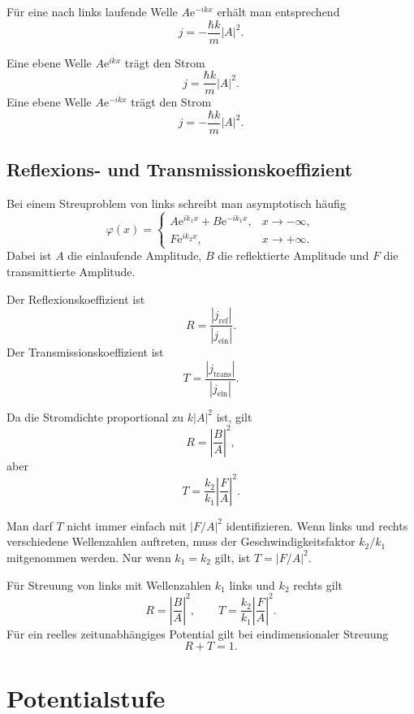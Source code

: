 Für eine nach links laufende Welle $A\mathrm{e}^{-ikx}$ erhält man entsprechend
\[
    j=-\frac{\hbar k}{m}|A|^2.
\]

\begin{formulabox}
Eine ebene Welle $A\mathrm{e}^{ikx}$ trägt den Strom
\[
    j=\frac{\hbar k}{m}|A|^2.
\]
Eine ebene Welle $A\mathrm{e}^{-ikx}$ trägt den Strom
\[
    j=-\frac{\hbar k}{m}|A|^2.
\]
\end{formulabox}

\subsection{Reflexions- und Transmissionskoeffizient}

Bei einem Streuproblem von links schreibt man asymptotisch häufig
\[
    \varphi(x)=
    \begin{cases}
        A\mathrm{e}^{ik_1x}+B\mathrm{e}^{-ik_1x}, & x\to -\infty,\\
        F\mathrm{e}^{ik_2x}, & x\to +\infty.
    \end{cases}
\]
Dabei ist $A$ die einlaufende Amplitude, $B$ die reflektierte Amplitude und $F$ die transmittierte Amplitude.

Der Reflexionskoeffizient ist
\[
    R=\frac{|j_{\mathrm{ref}}|}{|j_{\mathrm{ein}}|}.
\]
Der Transmissionskoeffizient ist
\[
    T=\frac{|j_{\mathrm{trans}}|}{|j_{\mathrm{ein}}|}.
\]

Da die Stromdichte proportional zu $k|A|^2$ ist, gilt
\[
    R=\left|\frac{B}{A}\right|^2,
\]
aber
\[
    T=\frac{k_2}{k_1}\left|\frac{F}{A}\right|^2.
\]

\begin{notebox}
Man darf $T$ nicht immer einfach mit $|F/A|^2$ identifizieren. Wenn links und rechts verschiedene Wellenzahlen auftreten, muss der Geschwindigkeitsfaktor $k_2/k_1$ mitgenommen werden. Nur wenn $k_1=k_2$ gilt, ist $T=|F/A|^2$.
\end{notebox}

\begin{formulabox}
Für Streuung von links mit Wellenzahlen $k_1$ links und $k_2$ rechts gilt
\[
    R=\left|\frac{B}{A}\right|^2,
    \qquad
    T=\frac{k_2}{k_1}\left|\frac{F}{A}\right|^2.
\]
Für ein reelles zeitunabhängiges Potential gilt bei eindimensionaler Streuung
\[
    R+T=1.
\]
\end{formulabox}

\section{Potentialstufe}

